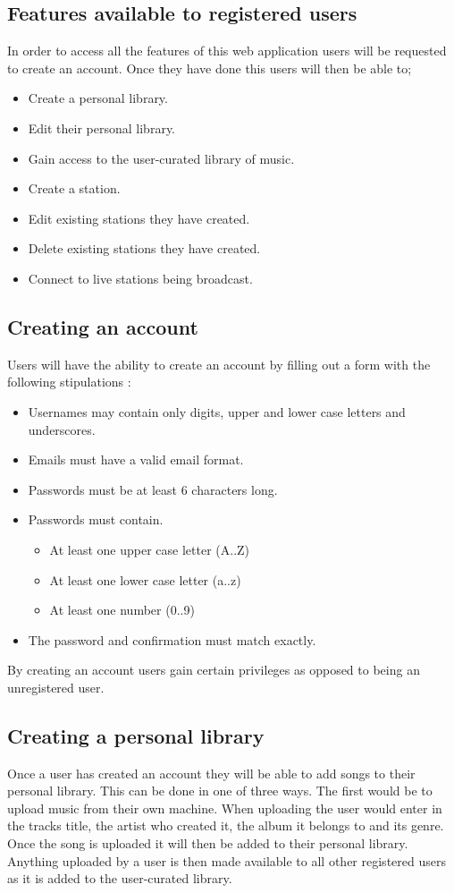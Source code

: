 \documentclass[a4paper, 12pt]{report}
\begin{document}
\subsection{Features available to registered users}
In order to access all the features of this web application users will be requested to create an account. Once they have done this users will then be able to;
\begin{itemize}
\item Create a personal library.
\item Edit their personal library.
\item Gain access to the user-curated library of music.
\item Create a station.
\item Edit existing stations they have created.
\item Delete existing stations they have created.
\item Connect to live stations being broadcast.
\end{itemize}

 
\subsection{Creating an account} 
Users will have the ability to create an account by filling out a form with the following stipulations : 
\begin{itemize}
\item Usernames may contain only digits, upper and lower case letters and underscores.
\item Emails must have a valid email format.
\item Passwords must be at least 6 characters long.
\item Passwords must contain.
\begin{itemize}
\item At least one upper case letter (A..Z)
\item At least one lower case letter (a..z)
\item At least one number (0..9)
\end{itemize}
\item The password and confirmation must match exactly.
\end{itemize}
By creating an account users gain certain privileges as opposed to being an unregistered user. 

\subsection{Creating a personal library} 
Once a user has created an account they will be able to add songs to their personal library. This can be done in one of three ways. The first would be to upload music from their own machine. When uploading the user would enter in the tracks title, the artist who created it, the album it belongs to and its genre. Once the song is uploaded it will then be added to their personal library. Anything uploaded by a user is then made available to all other registered users as it is added to the user-curated library.\\
\end{document}
